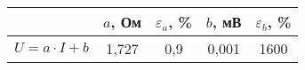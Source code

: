 \begin{tabular}{l|cccc}
	\toprule
	 & $a$, Ом & $\varepsilon_a$, \% & $b$, мВ & $\varepsilon_b$, \% \\ \midrule
	$U=a\cdot I + b$ & 1,727 & 0,9 & 0,001 & 1600 \\
\bottomrule
\end{tabular}